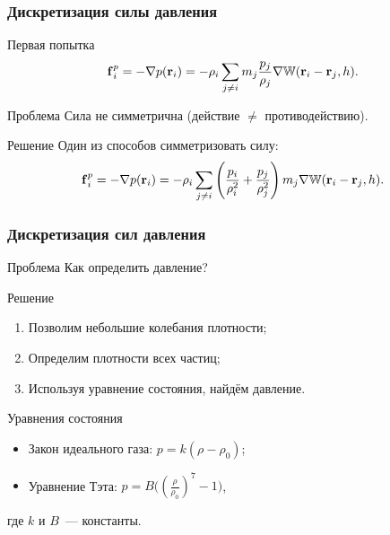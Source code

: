 \begin{frame}
  \frametitle{Дискретизация силы давления}

  \begin{block}{Первая попытка}
    \[ \boldsymbol{\mathbf{f}}_i^p=-\nabla p(\boldsymbol{\mathbf{r}}_i)=-\rho_i\sum_{j\neq i}m_j\frac{p_j}{\rho_j}\nabla\mathbb W(\boldsymbol{\mathbf{r}}_i-\boldsymbol{\mathbf{r}}_j, h). \]
  \end{block}

  \begin{block}{Проблема}
    Сила не симметрична (действие $\neq$ противодействию).
  \end{block}

  \begin{block}{Решение}
    Один из способов симметризовать силу:
    \[ \boldsymbol{\mathbf{f}}_i^p=-\nabla p(\boldsymbol{\mathbf{r}}_i)=-\rho_i\sum_{j\neq i}\left(\frac{p_i}{\rho_i^2}+\frac{p_j}{\rho_j^2}\right)m_j\nabla\mathbb W(\boldsymbol{\mathbf{r}}_i-\boldsymbol{\mathbf{r}}_j, h). \]
  \end{block}
\end{frame}

\begin{frame}
  \frametitle{Дискретизация сил давления}

  \begin{block}{Проблема}
    Как определить давление?
  \end{block}

  \begin{block}{Решение}
    \begin{enumerate}
      \item Позволим небольшие колебания плотности;
      \item Определим плотности всех частиц;
      \item Используя уравнение состояния, найдём давление.
    \end{enumerate}
  \end{block}

  \begin{block}{Уравнения состояния}
    \begin{itemize}
      \item Закон идеального газа: $p=k(\rho-\rho_0)$;
      \item Уравнение Тэта: $p=B\big((\frac{\rho}{\rho_0})^7-1\big)$,
    \end{itemize}
    где $k$ и $B$~--- константы.
  \end{block}
\end{frame}

